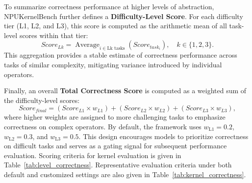 To summarize correctness performance at higher levels of abstraction, NPUKernelBench further defines a \textbf{Difficulty-Level Score}. For each difficulty tier (L1, L2, and L3), this score is computed as the arithmetic mean of all task-level scores within that tier:
\begin{equation}
   Score_{Lk} = \operatorname{Average}_{i \in \text{Lk tasks}} (Score_{task_i}), \quad k \in \{1,2,3\}.
\end{equation}
This aggregation provides a stable estimate of correctness performance across tasks of similar complexity, mitigating variance introduced by individual operators.

Finally, an overall \textbf{Total Correctness Score} is computed as a weighted sum of the difficulty-level scores:
\begin{equation}
   Score_{final} = (Score_{L1} \times w_{L1}) + (Score_{L2} \times w_{L2}) + (Score_{L3} \times w_{L3}),
\end{equation}
where higher weights are assigned to more challenging tasks to emphasize correctness on complex operators. By default, the framework uses $w_{\text{L1}} = 0.2$, $w_{\text{L2}} = 0.3$, and $w_{\text{L3}} = 0.5$. This design encourages models to prioritize correctness on difficult tasks and serves as a gating signal for subsequent performance evaluation. Scoring criteria for kernel evaluation is given in Table~\ref{tab:level_correctness}. Representative evaluation criteria under both default and customized settings are also given in Table~\ref{tab:kernel_correctness}.


